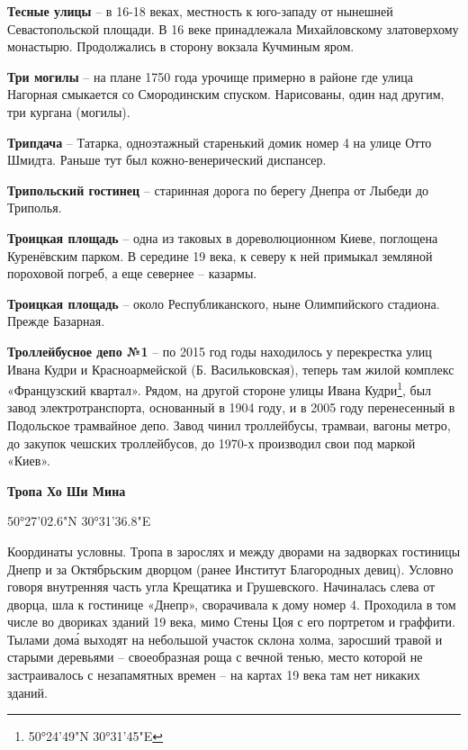 \medskip

\textbf{Тесные улицы} – в 16-18 веках, местность к юго-западу от нынешней Севастопольской площади. В 16 веке принадлежала Михайловскому златоверхому монастырю. Продолжались в сторону вокзала Кучминым яром.\\

\medskip

\textbf{Три могилы} – на плане 1750 года урочище примерно в районе где улица Нагорная смыкается со Смородинским спуском. Нарисованы, один над другим, три кургана (могилы).\\

\medskip


\textbf{Трипдача} – Татарка, одноэтажный старенький домик номер 4 на улице Отто Шмидта. Раньше тут был кожно-венерический диспансер.\\


\medskip

\textbf{Трипольский гостинец} – старинная дорога по берегу Днепра от Лыбеди до Триполья.\\

\medskip

\textbf{Троицкая площадь} – одна из таковых в дореволюционном Киеве, поглощена Куренёвским парком. В середине 19 века, к северу к ней примыкал земляной пороховой погреб, а еще севернее – казармы.\\

\medskip

\textbf{Троицкая площадь} – около Республиканского, ныне Олимпийского стадиона. Прежде Базарная.\\

\medskip

\textbf{Троллейбусное депо №1} – по 2015 год годы находилось у перекрестка улиц Ивана Кудри и Красноармейской (Б. Васильковская), теперь там жилой комплекс «Французский квартал». Рядом, на другой стороне улицы Ивана Кудри\footnote{50°24'49"N 30°31'45"E}, был завод электротранспорта, основанный в 1904 году, и в 2005 году перенесенный в Подольское трамвайное депо. Завод чинил троллейбусы, трамваи, вагоны метро, до закупок чешских троллейбусов, до 1970-х производил свои под маркой «Киев».\\


\medskip

\textbf{Тропа Хо Ши Мина}

50°27'02.6"N 30°31'36.8"E

Координаты условны. Тропа в зарослях и между дворами на задворках гостиницы Днепр и за Октябрьским дворцом (ранее Институт Благородных девиц). Условно говоря внутренняя часть угла Крещатика и Грушевского. Начиналась слева от дворца, шла к гостинице «Днепр», сворачивала к дому номер 4. Проходила в том числе во двориках зданий 19 века, мимо Стены Цоя с его портретом и граффити. Тылами дом\'а выходят на небольшой участок склона холма, заросший травой и старыми деревьями – своеобразная роща с вечной тенью, место которой не застраивалось с незапамятных времен – на картах 19 века там нет никаких зданий.

